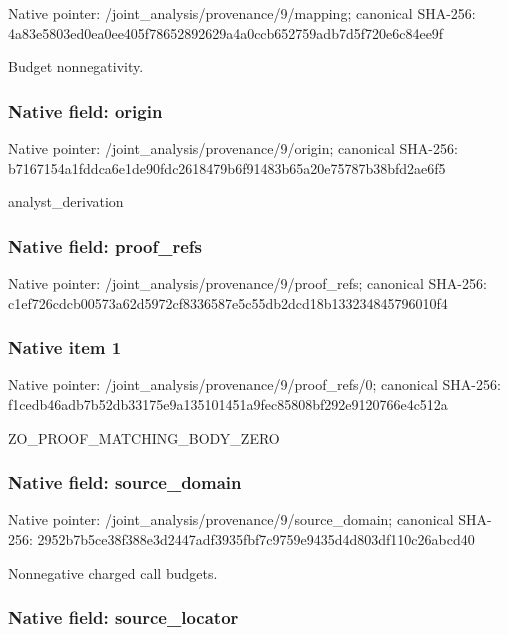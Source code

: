 \documentclass[10pt,a4paper]{article}
\begin{document}
Native pointer: /joint\_analysis/provenance/9/mapping; canonical SHA-256: 4a83e5803ed0ea0ee405f786\allowbreak{}52892629a4a0ccb652759adb\allowbreak{}7d5f720e6c84ee9f


Budget nonnegativity.


\subsubsection{Native field: origin}


Native pointer: /joint\_analysis/provenance/9/origin; canonical SHA-256: b7167154a1fddca6e1de90fd\allowbreak{}c2618479b6f91483b65a20e7\allowbreak{}5787b38bfd2ae6f5


analyst\_derivation


\subsubsection{Native field: proof\_refs}


Native pointer: /joint\_analysis/provenance/9/proof\_refs; canonical SHA-256: c1ef726cdcb00573a62d5972\allowbreak{}cf8336587e5c55db2dcd18b1\allowbreak{}33234845796010f4



\subsubsection{Native item 1}


Native pointer: /joint\_analysis/provenan\allowbreak{}ce/9/proof\_refs/0; canonical SHA-256: f1cedb46adb7b52db33175e9\allowbreak{}a135101451a9fec85808bf29\allowbreak{}2e9120766e4c512a


ZO\_PROOF\_MATCHING\_BODY\_ZERO


\subsubsection{Native field: source\_domain}


Native pointer: /joint\_analysis/provenan\allowbreak{}ce/9/source\_domain; canonical SHA-256: 2952b7b5ce38f388e3d2447a\allowbreak{}df3935fbf7c9759e9435d4d8\allowbreak{}03df110c26abcd40


Nonnegative charged call budgets.


\subsubsection{Native field: source\_locator}
\end{document}
